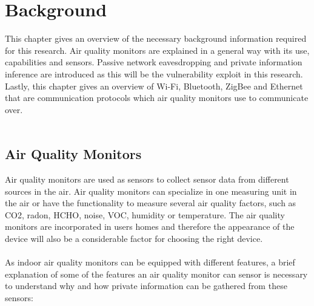 \chapter*{Background}
This chapter gives an overview of the necessary background information required for this research. Air quality monitors are explained in a general way with its use, capabilities and sensors. Passive network eavesdropping and private information inference are introduced as this will be the vulnerability exploit in this research. Lastly, this chapter gives an overview of Wi-Fi, Bluetooth, ZigBee and Ethernet that are communication protocols which air quality monitors use to communicate over. \\\\
\section*{Air Quality Monitors}
Air quality monitors are used as sensors to collect sensor data from different sources in the air. \cite{GeneralAirQualityMonitor} Air quality monitors can specialize in one measuring unit in the air or have the functionality to measure several air quality factors, such as CO2, radon, HCHO, noise, VOC, humidity or temperature. The air quality monitors are incorporated in users homes and therefore the appearance of the device will also be a considerable factor for choosing the right device. \cite{IAQMonitorCommunicationReview} 
\\\\
As indoor air quality monitors can be equipped with different features, a brief explanation of some of the features an air quality monitor can sensor is necessary to understand why and how private information can be gathered from these sensors:
